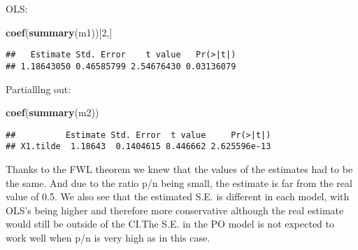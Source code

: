 \documentclass[
]{article}
\newenvironment{Shaded}{\begin{snugshade}}{\end{snugshade}}
\newcommand{\CommentTok}[1]{\textcolor[rgb]{0.56,0.35,0.01}{\textit{#1}}}
\newcommand{\DecValTok}[1]{\textcolor[rgb]{0.00,0.00,0.81}{#1}}
\newcommand{\FunctionTok}[1]{\textcolor[rgb]{0.13,0.29,0.53}{\textbf{#1}}}
\newcommand{\NormalTok}[1]{#1}
\newcommand{\OtherTok}[1]{\textcolor[rgb]{0.56,0.35,0.01}{#1}}
\newcommand{\SpecialCharTok}[1]{\textcolor[rgb]{0.81,0.36,0.00}{\textbf{#1}}}
\begin{document}
\begin{Shaded}
\end{Shaded}

OLS:

\begin{Shaded}
\begin{Highlighting}[]
\FunctionTok{coef}\NormalTok{(}\FunctionTok{summary}\NormalTok{(m1))[}\DecValTok{2}\NormalTok{,]}
\end{Highlighting}
\end{Shaded}

\begin{verbatim}
##   Estimate Std. Error    t value   Pr(>|t|) 
## 1.18643050 0.46585799 2.54676430 0.03136079
\end{verbatim}

Partialllng out:

\begin{Shaded}
\begin{Highlighting}[]
\FunctionTok{coef}\NormalTok{(}\FunctionTok{summary}\NormalTok{(m2))}
\end{Highlighting}
\end{Shaded}

\begin{verbatim}
##          Estimate Std. Error  t value     Pr(>|t|)
## X1.tilde  1.18643  0.1404615 8.446662 2.625596e-13
\end{verbatim}

Thanks to the FWL theorem we knew that the values of the estimates had
to be the same. And due to the ratio p/n being small, the estimate is
far from the real value of 0.5. We also see that the estimated S.E. is
different in each model, with OLS's being higher and therefore more
conservative although the real estimate would still be outside of the
CI.The S.E. in the PO model is not expected to work well when p/n is
very high as in this case.
\end{document}
